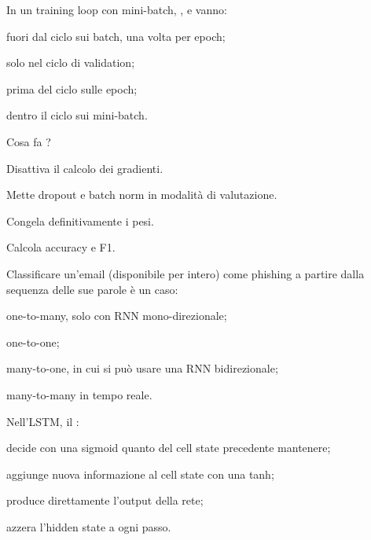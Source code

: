 \begin{domanda}\label{quiz:m23}
In un training loop con mini-batch, ,  e  vanno:
\begin{opzioni}
  \item fuori dal ciclo sui batch, una volta per epoch;
  \item solo nel ciclo di validation;
  \item prima del ciclo sulle epoch;
  \item dentro il ciclo sui mini-batch.
\end{opzioni}
\end{domanda}

\begin{domanda}\label{quiz:m24}
Cosa fa ?
\begin{opzioni}
  \item Disattiva il calcolo dei gradienti.
  \item Mette dropout e batch norm in modalità di valutazione.
  \item Congela definitivamente i pesi.
  \item Calcola accuracy e F1.
\end{opzioni}
\end{domanda}

\begin{domanda}[RNN]\label{quiz:m25}
Classificare un'email (disponibile per intero) come phishing a partire dalla sequenza delle sue parole è un caso:
\begin{opzioni}
  \item one-to-many, solo con RNN mono-direzionale;
  \item one-to-one;
  \item many-to-one, in cui si può usare una RNN bidirezionale;
  \item many-to-many in tempo reale.
\end{opzioni}
\end{domanda}

\begin{domanda}[LSTM]\label{quiz:m26}
Nell'LSTM, il :
\begin{opzioni}
  \item decide con una sigmoid quanto del cell state precedente mantenere;
  \item aggiunge nuova informazione al cell state con una tanh;
  \item produce direttamente l'output della rete;
  \item azzera l'hidden state a ogni passo.
\end{opzioni}
\end{domanda}

